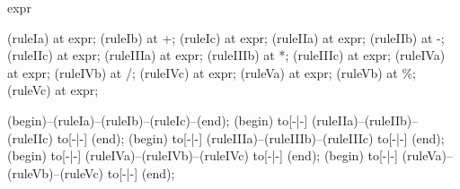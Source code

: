 \begin{syntax}{expr}
  
  \node[nonterminal] (ruleIa)  at  {expr};
  \node[terminal]    (ruleIb)  at  {+};
  \node[nonterminal] (ruleIc)  at  {expr};
  \node[nonterminal] (ruleIIa) at  {expr};
  \node[terminal]    (ruleIIb) at  {-};
  \node[nonterminal] (ruleIIc) at  {expr};
  \node[nonterminal] (ruleIIIa) at  {expr};
  \node[terminal]    (ruleIIIb) at  {*};
  \node[nonterminal] (ruleIIIc) at  {expr};
  \node[nonterminal] (ruleIVa) at  {expr};
  \node[terminal]    (ruleIVb) at  {/};
  \node[nonterminal] (ruleIVc) at  {expr};
  \node[nonterminal] (ruleVa) at  {expr};
  \node[terminal]    (ruleVb) at  {\%};
  \node[nonterminal] (ruleVc) at  {expr};
  
  \draw[path] (begin)--(ruleIa)--(ruleIb)--(ruleIc)--(end);
  \draw[path] (begin) to[-|-] (ruleIIa)--(ruleIIb)--(ruleIIc) to[-|-] (end);
  \draw[path] (begin) to[-|-] (ruleIIIa)--(ruleIIIb)--(ruleIIIc) to[-|-] (end);
  \draw[path] (begin) to[-|-] (ruleIVa)--(ruleIVb)--(ruleIVc) to[-|-] (end);
  \draw[path] (begin) to[-|-] (ruleVa)--(ruleVb)--(ruleVc) to[-|-] (end);
\end{syntax}
